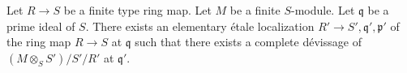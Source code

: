 \begin{lemma}
\label{lemma-existence-algebra}
Let $R \to S$ be a finite type ring map.
Let $M$ be a finite $S$-module.
Let $\mathfrak q$ be a prime ideal of $S$.
There exists an elementary \'etale localization
$R' \to S', \mathfrak q', \mathfrak p'$ of
the ring map $R \to S$ at $\mathfrak q$ such that
there exists a complete d\'evissage of
$(M \otimes_S S')/S'/R'$ at $\mathfrak q'$.
\end{lemma}